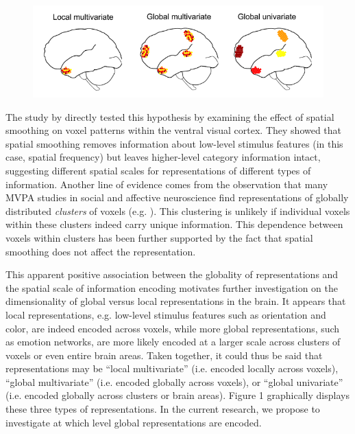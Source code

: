 \documentclass[jou,12pt,a4paper]{apa6}\usepackage[]{graphicx}\usepackage[]{color}
\begin{document}
\begin{figure}[h]
\centering
\includegraphics[scale=.55]{spatialDist2}
\end{figure}

The study by  directly tested this hypothesis by examining the effect of spatial smoothing on voxel patterns within the ventral visual cortex. They showed that spatial smoothing removes information about low-level stimulus features (in this case, spatial frequency) but leaves higher-level category information intact, suggesting different spatial scales for representations of different types of information. Another line of evidence comes from the observation that many MVPA studies in social and affective neuroscience find representations of globally distributed \emph{clusters} of voxels (e.g. ). This clustering is unlikely if individual voxels within these clusters indeed carry unique information. This dependence between voxels within clusters has been further supported by the fact that spatial smoothing \cite{oosterwijk2015,kassam2013} does not affect the representation.

This apparent positive association between the globality of representations and the spatial scale of information encoding motivates further investigation on the dimensionality of global versus local representations in the brain. It appears that local representations, e.g. low-level stimulus features such as orientation and color, are indeed encoded across voxels, while more global representations, such as emotion networks, are more likely encoded at a larger scale across clusters of voxels or even entire brain areas. Taken together, it could thus be said that representations may be ``local multivariate'' (i.e. encoded locally across voxels), ``global multivariate'' (i.e. encoded globally across voxels), or ``global univariate'' (i.e. encoded globally across clusters or brain areas). Figure 1 graphically displays these three types of representations. In the current research, we propose to investigate at which level global representations are encoded.
\end{document}
